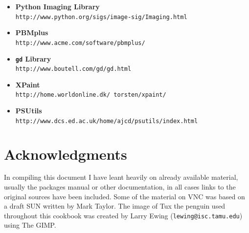 \documentclass[twoside,11pt]{article}
\newcommand{\htmladdnormallink}[2]{#1}
\newcommand{\htmlref}[2]{#1}
\newcommand{\xlabel}[1]{}
\begin{document}
\begin{itemize}
\item {\bf\label{sc15_available_pythonimg}Python Imaging Library}\\
\htmladdnormallink{{\tt http://www.python.org/sigs/image-sig/Imaging.html}}{http://www.python.org/sigs/image-sig/Imaging.html}

\item {\bf\label{sc15_available_pbmplus}PBMplus}\\
\htmladdnormallink{{\tt http://www.acme.com/software/pbmplus/}}{http://www.acme.com/software/pbmplus/}

\item {\bf\label{sc15_available_gd}{\tt gd} Library}\\
\htmladdnormallink{{\tt http://www.boutell.com/gd/gd.html}}{http://www.boutell.com/gd/gd.html}

\item {\bf\label{sc15_available_xpaint}{XPaint}}\\
\htmladdnormallink{{\tt http://home.worldonline.dk/~torsten/xpaint/}}{http://home.worldonline.dk/~torsten/xpaint/}

\item {\bf\label{sc15_available_psutils}{PSUtils}}\\
\htmladdnormallink{{\tt http://www.dcs.ed.ac.uk/home/ajcd/psutils/index.html}}{http://www.dcs.ed.ac.uk/home/ajcd/psutils/index.html}

\end{itemize}
           
\section*{\xlabel{sc15_acks}Acknowledgments\label{sc15_acks}}

In compiling this document I have leant heavily on already available material, usually the packages manual or other documentation, in all cases links to the original sources have been included. Some of the material on \htmlref{VNC}{sc15_vnc} was based on a draft SUN written by \htmladdnormallink{Mark Taylor}{http://www.ast.cam.ac.uk/~mbt/}. The image of \htmladdnormallink{Tux the penguin}{http://www.woodsoup.org/projs/tux_aqfh/doc/index.html} used throughout this cookbook was created by Larry Ewing \htmladdnormallink{({\tt lewing@isc.tamu.edu})}{mailto:lewing@isc.tamu.edu} using \htmlref{The GIMP}{sc15_gimp}.
\end{document}
